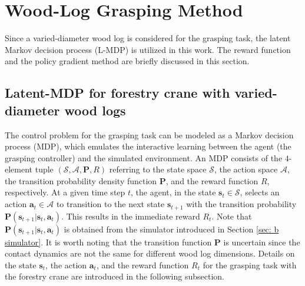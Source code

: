 \section{Wood-Log Grasping Method}
\label{sec: method}
Since a varied-diameter wood log is considered for the grasping task, the latent Markov decision process (L-MDP) \cite{chen2021understanding,vuong2019pick} is utilized in this work. The reward function and the policy gradient method are briefly discussed in this section. 


\subsection{Latent-MDP for forestry crane with varied-diameter wood logs}
The control problem for the grasping task can be modeled as a Markov decision process (MDP), which emulates the interactive learning between the agent (the grasping controller) and the simulated environment. An MDP consists of the $4$-element tuple $(\mathcal{S},\mathcal{A},\mathbf{P},R)$ referring to the state space $\mathcal{S}$, the action space $\mathcal{A}$, the transition probability density function $\mathbf{P}$, and the reward function $R$, respectively. 
At a given time step $t$, the agent, in the state $\mathbf{s}_t \in \mathcal{S}$, selects an action $\mathbf{a}_t \in \mathcal{A}$ to transition to the next state $\mathbf{s}_{t+1}$ %
with the transition probability $\mathbf{P}(\mathbf{s}_{t+1}|\mathbf{s}_t,\mathbf{a}_t)$. 
This results in the immediate reward $R_t$. Note that $\mathbf{P}(\mathbf{s}_{t+1}|\mathbf{s}_t,\mathbf{a}_t)$ is obtained from the simulator introduced in Section \ref{sec: b simulator}. It is worth noting that the transition function $\mathbf{P}$ is uncertain since the contact dynamics are not the same for different wood log dimensions.  
Details on the state $\mathbf{s}_t$, the action $\mathbf{a}_t$, and the reward function $R_t$ for the grasping task with the forestry crane are introduced in the following subsection. 

